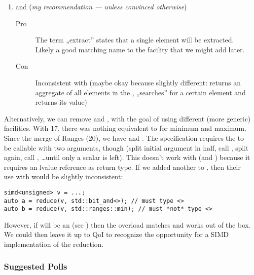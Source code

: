 \begin{enumerate}
  \item {} and
     (\emph{my recommendation --- unless convinced
    otherwise})
    \begin{description}
      \item[Pro] The term „extract'' states that a single element will be
        extracted. Likely a good matching name to the  facility
        that we might add later.
      \item[Con] Inconsistent with \std{} (maybe okay because
        slightly different:  returns an aggregate of all
        elements in the \simd,  „searches'' for a certain
        element and returns its value)
    \end{description}
\end{enumerate}

Alternatively, we can remove  and , with the goal of
using different (more generic) facilities.
With \CC{}17, there was nothing equivalent to \std{} for minimum
and maximum.
Since the merge of Ranges (\CC{}20), we have \stdranges{} and
\stdranges{}.
The  specification requires the  to be
callable with two  arguments, though (split initial argument in
half, call , split again, call , \ldots until
only a scalar is left).
This doesn't work with \stdranges{} (and ) because it
requires an lvalue reference as return type.
If we added another  to \stdranges{}, then their
use with  would be slightly inconsistent:
\medskip\begin{lstlisting}
simd<unsigned> v = ...;
auto a = reduce(v, std::bit_and<>); // must type <>
auto b = reduce(v, std::ranges::min); // must *not* type <>
\end{lstlisting}

However, if  will be an  (see )
then the
\stdranges{} overload matches and \stdranges{} works out of
the box.
We could then leave it up to QoI to recognize the opportunity for a SIMD
implementation of the reduction.

\subsubsection{Suggested Polls}

